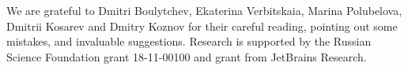 \begin{acks}
We are grateful to Dmitri Boulytchev, Ekaterina Verbitskaia, Marina Polubelova, Dmitrii Kosarev and Dmitry Koznov for their careful reading, pointing out some mistakes, and invaluable suggestions. Research is supported by the Russian Science Foundation grant 18-11-00100 and grant from JetBrains Research.
	
\end{acks}